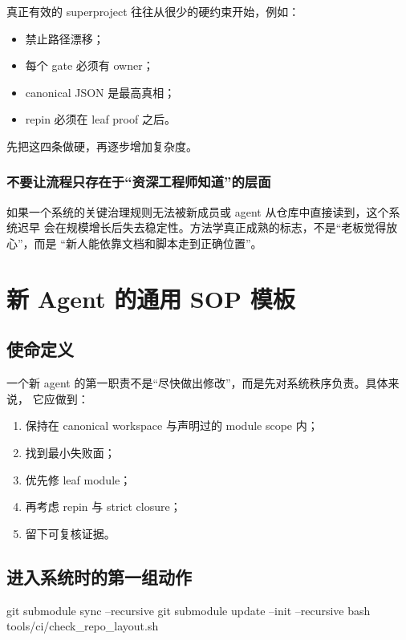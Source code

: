 \documentclass[UTF8,11pt,a4paper,oneside]{ctexbook}
\begin{document}
真正有效的 superproject 往往从很少的硬约束开始，例如：

\begin{itemize}
  \item 禁止路径漂移；
  \item 每个 gate 必须有 owner；
  \item canonical JSON 是最高真相；
  \item repin 必须在 leaf proof 之后。
\end{itemize}

先把这四条做硬，再逐步增加复杂度。

\subsection{不要让流程只存在于“资深工程师知道”的层面}

如果一个系统的关键治理规则无法被新成员或 agent 从仓库中直接读到，这个系统迟早
会在规模增长后失去稳定性。方法学真正成熟的标志，不是“老板觉得放心”，而是
“新人能依靠文档和脚本走到正确位置”。

\chapter{新 Agent 的通用 SOP 模板}

\section{使命定义}

一个新 agent 的第一职责不是“尽快做出修改”，而是先对系统秩序负责。具体来说，
它应做到：

\begin{enumerate}
  \item 保持在 canonical workspace 与声明过的 module scope 内；
  \item 找到最小失败面；
  \item 优先修 leaf module；
  \item 再考虑 repin 与 strict closure；
  \item 留下可复核证据。
\end{enumerate}

\section{进入系统时的第一组动作}

\begin{CodeBlock}
git submodule sync --recursive
git submodule update --init --recursive
bash tools/ci/check_repo_layout.sh
\end{CodeBlock}
\end{document}
